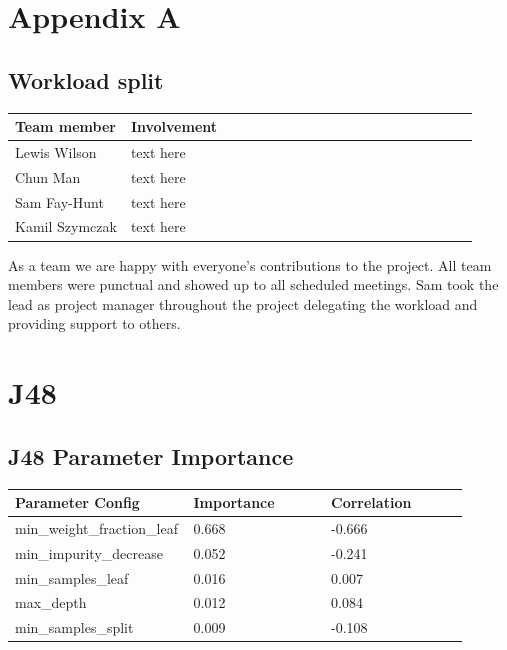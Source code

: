 \documentclass[11pt]{article}
\begin{document}
\pagebreak
\appendix
\appendixpage
\addappheadtotoc
\begin{appendices}

\section{Appendix A}


\subsection{Workload split}
  
  \begin{table}[ht]
    \centering
    \begin{tabular}{|p{0.25\linewidth} | p{0.8\linewidth}|} 
      \hline
      \textbf{Team member}  & \textbf{Involvement} \\ \hline
      Lewis Wilson & text here \\ \hline
      Chun Man & text here  \\ \hline
      Sam Fay-Hunt & text here \\ \hline
      Kamil Szymczak & text here \\ \hline
    \end{tabular}
  \end{table}\label{ContributionTab}

As a team we are happy with everyone's contributions to the project. All team members were punctual and showed up to all scheduled meetings. Sam took the lead as project manager throughout the project delegating the workload and providing support to others.


\newpage
\section{J48}

\subsection{J48 Parameter Importance}
  \begin{table}[ht]
    \centering
    \begin{tabular}{|p{0.3\linewidth} | p{0.3\linewidth}| p{0.3\linewidth}|} 
      \hline
      \textbf{Parameter Config}  & \textbf{Importance} & \textbf{Correlation} \\ \hline
        min\_weight\_fraction\_leaf & 0.668  & -0.666 \\ \hline
        min\_impurity\_decrease & 0.052 & -0.241 \\ \hline
        min\_samples\_leaf & 0.016 & 0.007 \\ \hline
        max\_depth & 0.012 & 0.084 \\ \hline
        min\_samples\_split & 0.009 & -0.108 \\ \hline


\end{tabular}
\end{table}
\end{appendices}
\end{document}
